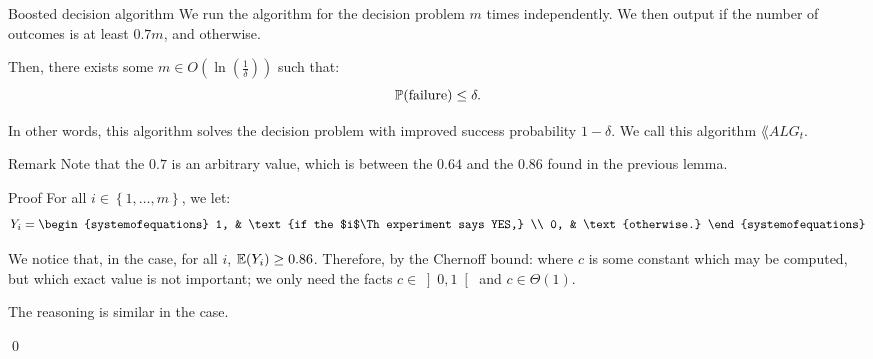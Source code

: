 \documentclass[a4paper]{article}
\begin{document}
\begin{parag}{Boosted decision algorithm}
    We run the algorithm for the decision problem $m$ times independently. We then output  if the number of outcomes is at least $0.7m$, and  otherwise.

    Then, there exists some $m \in O\left(\ln\left(\frac{1}{\delta}\right)\right)$ such that: 
    \[\prob\left(\text{failure}\right) \leq \delta.\]

    In other words, this algorithm solves the decision problem with improved success probability $1 - \delta$. We call this algorithm $\lang{ALG}_t$.

    \begin{subparag}{Remark}
        Note that the $0.7$ is an arbitrary value, which is between the $0.64$ and the $0.86$ found in the previous lemma.
    \end{subparag}
    
    \begin{subparag}{Proof}
        For all $i \in \left\{1, \ldots, m\right\}$, we let: 
        \[Y_i = \begin{systemofequations} 1, & \text{if the $i$\Th experiment says YES,} \\ 0, & \text{otherwise.} \end{systemofequations}\]

        We notice that, in the  case, for all $i$, $\exval\left(Y_i\right) \geq 0.86$. Therefore, by the Chernoff bound: 
        where $c$ is some constant which may be computed, but which exact value is not important; we only need the facts $c \in \left]0, 1\right[ $ and $c \in \Theta\left(1\right)$.

        The reasoning is similar in the  case.

        \qed
    \end{subparag}
\end{parag}
\end{document}
